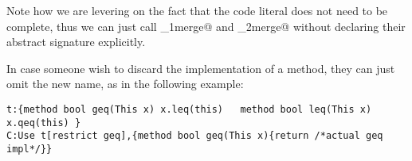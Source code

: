 Note how we are levering on the fact that the code literal
 does not need to be complete, 
thus we can just call \Q@_1merge@ and \Q@_2merge@ without
 declaring their abstract signature explicitly.

In case someone wish to discard the implementation of a \Q@restricted@ method,
they can just omit the new name, as in the following example:
\begin{lstlisting}
t:{method bool geq(This x) x.leq(this)   method bool leq(This x) x.qeq(this) }
C:Use t[restrict geq],{method bool geq(This x){return /*actual geq impl*/}}
\end{lstlisting}
